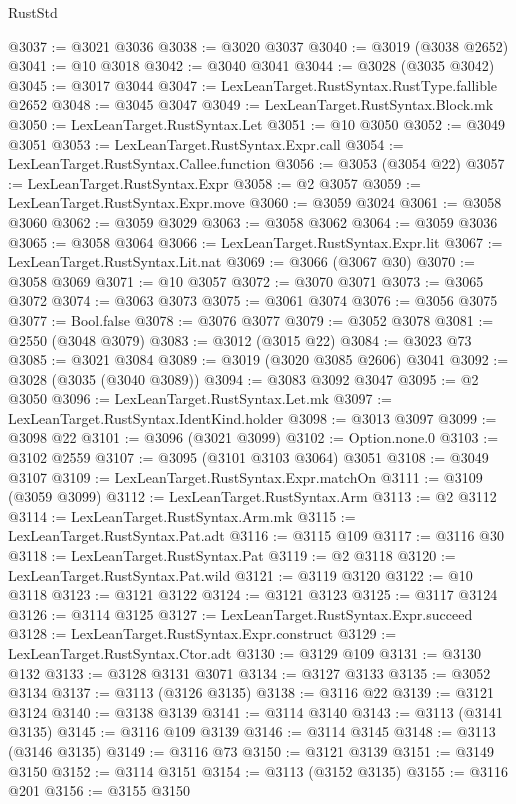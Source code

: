 \begin{lexlean}{RustStd}
\begin{coremodule}
{\begin{coremodule}
{{{{{{{{{{{{{{{{{{{{{{{{{{{{{{{{@3037 := @3021 @3036
@3038 := @3020 @3037
@3040 := @3019 (@3038 @2652)
@3041 := @10 @3018
@3042 := @3040 @3041
@3044 := @3028 (@3035 @3042)
@3045 := @3017 @3044
@3047 := LexLeanTarget.RustSyntax.RustType.fallible @2652
@3048 := @3045 @3047
@3049 := LexLeanTarget.RustSyntax.Block.mk
@3050 := LexLeanTarget.RustSyntax.Let
@3051 := @10 @3050
@3052 := @3049 @3051
@3053 := LexLeanTarget.RustSyntax.Expr.call
@3054 := LexLeanTarget.RustSyntax.Callee.function
@3056 := @3053 (@3054 @22)
@3057 := LexLeanTarget.RustSyntax.Expr
@3058 := @2 @3057
@3059 := LexLeanTarget.RustSyntax.Expr.move
@3060 := @3059 @3024
@3061 := @3058 @3060
@3062 := @3059 @3029
@3063 := @3058 @3062
@3064 := @3059 @3036
@3065 := @3058 @3064
@3066 := LexLeanTarget.RustSyntax.Expr.lit
@3067 := LexLeanTarget.RustSyntax.Lit.nat
@3069 := @3066 (@3067 @30)
@3070 := @3058 @3069
@3071 := @10 @3057
@3072 := @3070 @3071
@3073 := @3065 @3072
@3074 := @3063 @3073
@3075 := @3061 @3074
@3076 := @3056 @3075
@3077 := Bool.false
@3078 := @3076 @3077
@3079 := @3052 @3078
@3081 := @2550 (@3048 @3079)
@3083 := @3012 (@3015 @22)
@3084 := @3023 @73
@3085 := @3021 @3084
@3089 := @3019 (@3020 @3085 @2606) @3041
@3092 := @3028 (@3035 (@3040 @3089))
@3094 := @3083 @3092 @3047
@3095 := @2 @3050
@3096 := LexLeanTarget.RustSyntax.Let.mk
@3097 := LexLeanTarget.RustSyntax.IdentKind.holder
@3098 := @3013 @3097
@3099 := @3098 @22
@3101 := @3096 (@3021 @3099)
@3102 := Option.none.{0}
@3103 := @3102 @2559
@3107 := @3095 (@3101 @3103 @3064) @3051
@3108 := @3049 @3107
@3109 := LexLeanTarget.RustSyntax.Expr.matchOn
@3111 := @3109 (@3059 @3099)
@3112 := LexLeanTarget.RustSyntax.Arm
@3113 := @2 @3112
@3114 := LexLeanTarget.RustSyntax.Arm.mk
@3115 := LexLeanTarget.RustSyntax.Pat.adt
@3116 := @3115 @109
@3117 := @3116 @30
@3118 := LexLeanTarget.RustSyntax.Pat
@3119 := @2 @3118
@3120 := LexLeanTarget.RustSyntax.Pat.wild
@3121 := @3119 @3120
@3122 := @10 @3118
@3123 := @3121 @3122
@3124 := @3121 @3123
@3125 := @3117 @3124
@3126 := @3114 @3125
@3127 := LexLeanTarget.RustSyntax.Expr.succeed
@3128 := LexLeanTarget.RustSyntax.Expr.construct
@3129 := LexLeanTarget.RustSyntax.Ctor.adt
@3130 := @3129 @109
@3131 := @3130 @132
@3133 := @3128 @3131 @3071
@3134 := @3127 @3133
@3135 := @3052 @3134
@3137 := @3113 (@3126 @3135)
@3138 := @3116 @22
@3139 := @3121 @3124
@3140 := @3138 @3139
@3141 := @3114 @3140
@3143 := @3113 (@3141 @3135)
@3145 := @3116 @109 @3139
@3146 := @3114 @3145
@3148 := @3113 (@3146 @3135)
@3149 := @3116 @73
@3150 := @3121 @3139
@3151 := @3149 @3150
@3152 := @3114 @3151
@3154 := @3113 (@3152 @3135)
@3155 := @3116 @201
@3156 := @3155 @3150
}}}}}}}}}}}}}}}}}}}}}}}}}}}}}}}}
\end{coremodule}}
\end{coremodule}
\end{lexlean}
